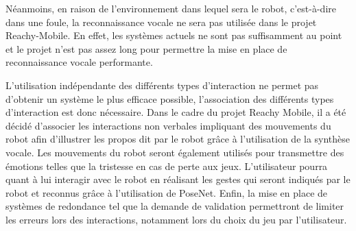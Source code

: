 Néanmoins, en raison de l’environnement dans lequel sera le robot, c'est-à-dire dans une foule, la reconnaissance vocale ne sera pas utilisée dans le projet Reachy-Mobile. En effet, les systèmes actuels ne sont pas suffisamment au point et le projet n’est pas assez long pour permettre la mise en place de reconnaissance vocale performante.

L’utilisation indépendante des différents types d’interaction ne permet pas d'obtenir un système le plus efficace possible, l'association des différents types d'interaction est donc nécessaire. Dans le cadre du projet Reachy Mobile, il a été décidé d'associer les interactions non verbales impliquant des mouvements du robot afin d’illustrer les propos dit par le robot grâce à l’utilisation de la synthèse vocale. Les mouvements du robot seront également utilisés pour transmettre des émotions telles que la tristesse en cas de perte aux jeux. L’utilisateur pourra quant à lui interagir avec le robot en réalisant les gestes qui seront indiqués par le robot et reconnus grâce à l'utilisation de PoseNet. Enfin, la mise en place de systèmes de redondance tel que la demande de validation permettront de limiter les erreurs lors des interactions, notamment lors du choix du jeu par l’utilisateur. 


